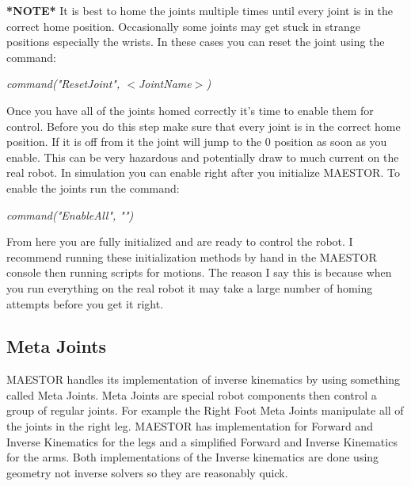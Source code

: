 \documentclass[12pt]{article}
\begin{document}
\noindent \textbf{*NOTE*} It is best to home the joints multiple times until every joint is in the correct home position. Occasionally some joints may get stuck in strange positions especially the wrists. In these cases you can reset the joint using the command:

	\begin{center}
		\textit{command("ResetJoint", $<$JointName$>$)}
	\end{center}

Once you have all of the joints homed correctly it's time to enable them for control. Before you do this step make sure that every joint is in the correct home position. If it is off from it the joint will jump to the 0 position as soon as you enable. This can be very hazardous and potentially draw to much current on the real robot. In simulation you can enable right after you initialize MAESTOR. To enable the joints run the command:

	\begin{center}
		\textit{command("EnableAll", "")}
	\end{center}
	
From here you are fully initialized and are ready to control the robot. I recommend running these initialization methods by hand in the MAESTOR console then running scripts for motions. The reason I say this is because when you run everything on the real robot it may take a large number of homing attempts before you get it right. 

\subsection{Meta Joints}

MAESTOR handles its implementation of inverse kinematics by using something called Meta Joints. Meta Joints are special robot components then control a group of regular joints. For example the Right Foot Meta Joints manipulate all of the joints in the right leg. MAESTOR has implementation for Forward and Inverse Kinematics for the legs and a simplified Forward and Inverse Kinematics for the arms. Both implementations of the Inverse kinematics are done using geometry not inverse solvers so they are reasonably quick. 
\end{document}
